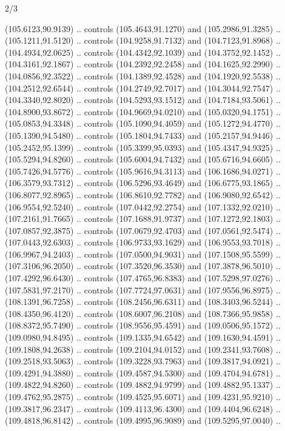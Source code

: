 \begin{flagdescription}{2/3}
\begin{scope}[shift={(0.5\flaglength,0.5)},scale=\flagwidth/320]
\begin{scope}[y=0.8pt, x=0.8pt, yscale=-1,shift={(-118.3,-146)}]
  (105.6123,90.9139) .. controls (105.4643,91.1270) and (105.2986,91.3285) ..
  (105.1211,91.5120) .. controls (104.9258,91.7132) and (104.7123,91.8968) ..
  (104.4934,92.0625) .. controls (104.4342,92.1039) and (104.3752,92.1452) ..
  (104.3161,92.1867) .. controls (104.2392,92.2458) and (104.1625,92.2990) ..
  (104.0856,92.3522) .. controls (104.1389,92.4528) and (104.1920,92.5538) ..
  (104.2512,92.6544) .. controls (104.2749,92.7017) and (104.3044,92.7547) ..
  (104.3340,92.8020) .. controls (104.5293,93.1512) and (104.7184,93.5061) ..
  (104.8900,93.8672) .. controls (104.9669,94.0210) and (105.0320,94.1751) ..
  (105.0853,94.3348) .. controls (105.1090,94.4059) and (105.1272,94.4770) ..
  (105.1390,94.5480) .. controls (105.1804,94.7433) and (105.2157,94.9446) ..
  (105.2452,95.1399) .. controls (105.3399,95.0393) and (105.4347,94.9325) ..
  (105.5294,94.8260) .. controls (105.6004,94.7432) and (105.6716,94.6605) ..
  (105.7426,94.5776) .. controls (105.9616,94.3113) and (106.1686,94.0271) ..
  (106.3579,93.7312) .. controls (106.5296,93.4649) and (106.6775,93.1865) ..
  (106.8077,92.8965) .. controls (106.8610,92.7782) and (106.9080,92.6542) ..
  (106.9554,92.5240) .. controls (107.0442,92.2754) and (107.1332,92.0210) ..
  (107.2161,91.7665) .. controls (107.1688,91.9737) and (107.1272,92.1803) ..
  (107.0857,92.3875) .. controls (107.0679,92.4703) and (107.0561,92.5474) ..
  (107.0443,92.6303) .. controls (106.9733,93.1629) and (106.9553,93.7018) ..
  (106.9967,94.2403) .. controls (107.0500,94.9031) and (107.1508,95.5599) ..
  (107.3106,96.2050) .. controls (107.3520,96.3530) and (107.3878,96.5010) ..
  (107.4292,96.6430) .. controls (107.4765,96.8383) and (107.5298,97.0276) ..
  (107.5831,97.2170) .. controls (107.7724,97.0631) and (107.9556,96.8975) ..
  (108.1391,96.7258) .. controls (108.2456,96.6311) and (108.3403,96.5244) ..
  (108.4350,96.4120) .. controls (108.6007,96.2108) and (108.7366,95.9858) ..
  (108.8372,95.7490) .. controls (108.9556,95.4591) and (109.0506,95.1572) ..
  (109.0980,94.8495) .. controls (109.1335,94.6542) and (109.1630,94.4591) ..
  (109.1808,94.2638) .. controls (109.2104,94.0152) and (109.2341,93.7608) ..
  (109.2518,93.5063) .. controls (109.3228,93.7963) and (109.3817,94.0921) ..
  (109.4291,94.3880) .. controls (109.4587,94.5300) and (109.4704,94.6781) ..
  (109.4822,94.8260) .. controls (109.4882,94.9799) and (109.4882,95.1337) ..
  (109.4762,95.2875) .. controls (109.4525,95.6071) and (109.4231,95.9210) ..
  (109.3817,96.2347) .. controls (109.4113,96.4300) and (109.4404,96.6248) ..
  (109.4818,96.8142) .. controls (109.4995,96.9089) and (109.5295,97.0040) ..

\end{scope}
\end{scope}
\end{flagdescription}

